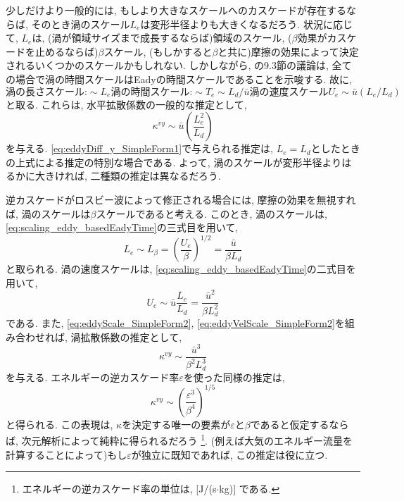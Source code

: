 少しだけより一般的には, もしより大きなスケールへのカスケードが存在するならば,
そのとき渦のスケール$L_e$は変形半径よりも大きくなるだろう.
状況に応じて, $L_e$は, (渦が領域サイズまで成長するならば)領域のスケール,
($\beta$効果がカスケードを止めるならば)$\beta$スケール,
(もしかすると$\beta$と共に)摩擦の効果によって決定されるいくつかのスケールかもしれない. 
しかしながら, \citet{vallis2006atmospheric}の9.3節の議論は,
全ての場合で渦の時間スケールはEadyの時間スケールであることを示唆する.
故に,
\begin{subequations} %
 \begin{equation}
   \textrm{渦の長さスケール:} \sim L_e
 \end{equation}
 \begin{equation}
   \textrm{渦の時間スケール:} \sim T_e \sim L_d/\bar{u}
 \end{equation}
 \begin{equation}
   \textrm{渦の速度スケール} U_e \sim \bar{u} (L_e/L_d)
 \end{equation}
 \label{eq:scaling_eddy_basedEadyTime}
\end{subequations}
と取る.
これらは, 水平拡散係数の一般的な推定として,
\begin{equation}
 \boxed{
  \kappa^{vy} \sim \bar{u} \left(\dfrac{L_e^2}{L_d}\right)
  }
 \label{eq:eddyDiff_y_SimpleForm2}
\end{equation}
を与える.
\eqref{eq:eddyDiff_y_SimpleForm1}で与えられる推定は,
$L_e=L_d$としたときの上式による推定の特別な場合である.
よって, 渦のスケールが変形半径よりはるかに大きければ, 二種類の推定は異なるだろう.

逆カスケードがロスビー波によって修正される場合には, 摩擦の効果を無視すれば, 
渦のスケールは$\beta$スケールであると考える.
このとき, 渦のスケールは, \eqref{eq:scaling_eddy_basedEadyTime}の三式目を用いて, 
\begin{equation}
 L_e \sim L_\beta = \left(\dfrac{U_e}{\beta}\right)^{1/2}
  = \dfrac{\bar{u}}{\beta L_d}
  \label{eq:eddyScale_SimpleForm2}
\end{equation}
と取られる. 
渦の速度スケールは, \eqref{eq:scaling_eddy_basedEadyTime}の二式目を用いて,
\begin{equation}
 U_e \sim \bar{u}\dfrac{L_e}{L_d} = \dfrac{\bar{u}^2}{\beta L_d^2}
  \label{eq:eddyVelScale_SimpleForm2}
\end{equation}
である.
また, \eqref{eq:eddyScale_SimpleForm2}, \eqref{eq:eddyVelScale_SimpleForm2}を組み合わせれば,
渦拡散係数の推定として,
\begin{equation}
 \kappa^{vy} \sim \dfrac{\bar{u}^3}{\beta^2 L_d^3}
 \label{eq:eddyDiffCoef_y_betaScale}
\end{equation}
を与える.
エネルギーの逆カスケード率$\varepsilon$を使った同様の推定は, 
\begin{equation}
  \kappa^{vy} \sim \left(\dfrac{\varepsilon^3}{\beta^4}\right)^{1/5}
\end{equation}
と得られる. 
この表現は, $\kappa$を決定する唯一の要素が$\varepsilon$と$\beta$であると仮定するならば,
次元解析によって純粋に得られるだろう%
\footnote{
エネルギーの逆カスケード率の単位は, [J/(s$\cdot$kg)] である. 
}.
(例えば大気のエネルギー流量を計算することによって)もし$\varepsilon$が独立に既知であれば, この推定は役に立つ. 

